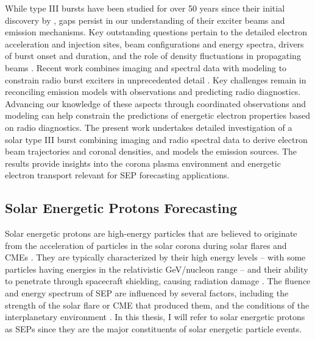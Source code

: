 While type III bursts have been studied for over 50 years since their initial discovery by \citet{wild_1950a, wild_1950b, wild_1950c}, gaps persist in our understanding of their exciter beams and emission mechanisms. Key outstanding questions pertain to the detailed electron acceleration and injection sites, beam configurations and energy spectra, drivers of burst onset and duration, and the role of density fluctuations in propagating beams \citep{reid_2018a, reid_2018b, li_2012a}. Recent work combines imaging and spectral data with modeling to constrain radio burst exciters in unprecedented detail \citep{chen_2013b, kontar_2017}. Key challenges remain in reconciling emission models with observations and predicting radio diagnostics. Advancing our knowledge of these aspects through coordinated observations and modeling can help constrain the predictions of energetic electron properties based on radio diagnostics. The present work undertakes detailed investigation of a solar type III burst combining imaging and radio spectral data to derive electron beam trajectories and coronal densities, and models the emission sources. The results provide insights into the corona plasma environment and energetic electron transport relevant for SEP forecasting applications.


\subsection{Solar Energetic Protons Forecasting}
Solar energetic protons are high-energy particles that are believed to originate from the acceleration of particles in the solar corona during solar flares and CMEs \citep{aschwanden_2002, lin_2005, lin_2011, klein_2017, kahler_2017}. They are typically characterized by their high energy levels -- with some particles having energies in the relativistic GeV/nucleon range -- and their ability to penetrate through spacecraft shielding, causing radiation damage \citep{reames_2013, desai_2016}. The fluence and energy spectrum of SEP are influenced by several factors, including the strength of the solar flare or CME that produced them, and the conditions of the interplanetary environment \citep{kahler_1984, kahler_1987, debrunner_1988, miteva_2013, trottet_2015, dierckxsens_2015, le_2017, gopalswamy_2017}. In this thesis, I will refer to solar energetic protons as SEPs since they are the major constituents of solar energetic particle events.

